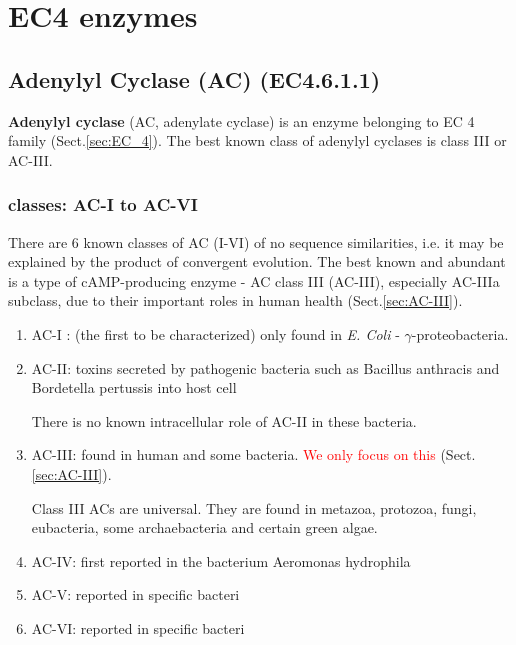 \chapter{EC4 enzymes}
\label{chap:EC4-enzymes}

\section{Adenylyl Cyclase (AC) (EC4.6.1.1)}
\label{sec:AC_adenylyl_cyclase}
\label{sec:adenylyl_cyclase}

{\bf Adenylyl cyclase} (AC, adenylate cyclase)  is an enzyme 
belonging to EC 4 family (Sect.\ref{sec:EC_4}).  The best known class of
adenylyl cyclases is class III or AC-III.

\subsection{classes: AC-I to AC-VI}
\label{sec:adenylyl-cyclase-classes}

There are 6 known classes of AC (I-VI) of no sequence similarities, i.e. it may
be explained by the product of convergent evolution. The best known and abundant
is a type of cAMP-producing enzyme - AC class III (AC-III), especially
AC-IIIa subclass, due to their important roles in human health
(Sect.\ref{sec:AC-III}).


\begin{enumerate}
  \item AC-I : (the first to be characterized) only found in {\it E. Coli} -
  $\gamma$-proteobacteria.

  \item AC-II: toxins secreted by  pathogenic bacteria such as Bacillus
  anthracis and Bordetella pertussis into host cell 

There is no known intracellular role of AC-II in these bacteria.

  \item AC-III: found in human and some bacteria. \textcolor{red}{We only focus
  on this} (Sect.\ref{sec:AC-III}).
  
Class III ACs are universal. They are found in metazoa, protozoa, fungi,
eubacteria, some archaebacteria and certain green algae.

  \item AC-IV: first reported in the bacterium Aeromonas hydrophila
  \item AC-V: reported in specific bacteri
  \item AC-VI: reported in specific bacteri
\end{enumerate}

